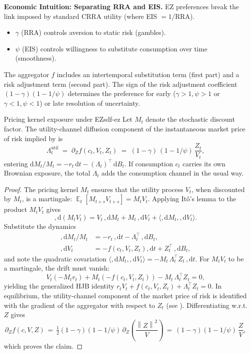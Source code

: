 ﻿\documentclass[11pt,letterpaper,oneside]{article}
\numberwithin{equation}{section}
\DeclareMathOperator{\E}{\mathbb{E}}
\newcommand{\1}{\mathbf{1}}
\newcommand{\diff}{,\mathrm{d}}
\newcommand{\norm}[1]{\left\lVert #1\right\rVert}
\begin{document}
\begin{tcolorbox}[didacticstyle]
\textbf{Economic Intuition: Separating RRA and EIS.}
EZ preferences break the link imposed by standard CRRA utility (where EIS $= 1/\text{RRA}$).
\begin{itemize}[leftmargin=1.15em,itemsep=0.25em]
 \item $\gamma$ (RRA) controls aversion to static risk (gambles).
 \item $\psi$ (EIS) controls willingness to substitute consumption over time (smoothness).
\end{itemize}
The aggregator $f$ includes an intertemporal substitution term (first part) and a risk adjustment term (second part). The sign of the risk adjustment coefficient $(1-\gamma)(1-1/\psi)$ determines the preference for early ($\gamma>1, \psi>1$ or $\gamma<1, \psi<1$) or late resolution of uncertainty.
\end{tcolorbox}

\begin{proposition}{Pricing kernel exposure under EZ}{sdf-ez}
Let $M_t$ denote the stochastic discount factor. The utility-channel diffusion
component of the instantaneous market price of risk implied by
 is
\[
\Lambda^{\mathrm{util}}_t \;=\; \partial_Z f(c_t, V_t, Z_t) \;=\; (1-\gamma)\,(1-1/\psi)\,\frac{Z_t}{V_t},
\]
entering $\mathrm{d}M_t/M_t = -r_t\,\mathrm{d}t - (\Lambda_t)^{\!\top}\,\mathrm{d}B_t$.
If consumption $c_t$ carries its own Brownian exposure, the total $\Lambda_t$ adds
the consumption channel in the usual way.
\end{proposition}

\begin{proof}
The pricing kernel $M_t$ ensures that the utility process $V_t$, when discounted by $M_t$, is a martingale: $\E_t[M_{t+s} V_{t+s}] = M_t V_t$.
Applying It\^o's lemma to the product $M_t V_t$ gives
\[
\diff (M_t V_t) = V_t \,\diff M_t + M_t \,\diff V_t + \langle \diff M_t, \diff V_t \rangle.
\]
Substitute the dynamics
\begin{align*}
\diff M_t/M_t &= -r_t\,\diff t - \Lambda_t^\top \,\diff B_t, \\
\diff V_t &= -f(c_t, V_t, Z_t)\diff t + Z_t^\top \,\diff B_t,
\end{align*}
and note the quadratic covariation $\langle \diff M_t, \diff V_t \rangle = -M_t\, \Lambda_t^\top Z_t\,\diff t$.
For $M_t V_t$ to be a martingale, the drift must vanish:
\[
V_t (-M_t r_t) + M_t (-f(c_t, V_t, Z_t)) - M_t \,\Lambda_t^\top Z_t = 0,
\]
yielding the generalized HJB identity $r_t V_t + f(c_t,V_t,Z_t) + \Lambda_t^\top Z_t = 0$.
In equilibrium, the utility-channel component of the market price of risk is identified with the gradient of the aggregator with respect to $Z_t$ (see \cite{duffie_epstein_1992}). Differentiating  w.r.t. $Z$ gives
\[
\partial_Z f(c,V,Z) \,=\, \tfrac{1}{2}(1-\gamma)(1-1/\psi)\,\partial_Z\!\left(\frac{\norm{Z}^2}{V}\right)
\,=\, (1-\gamma)(1-1/\psi)\,\frac{Z}{V},
\]
which proves the claim.
\end{proof}
\end{document}
